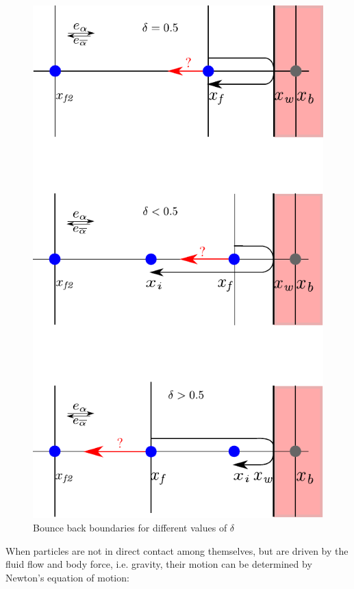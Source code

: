 \begin{figure}[htbp]
\centering
\includegraphics[scale=1]{bouncemod}
\caption{Bounce back boundaries for different values of $\delta$}
\label{fig:bouncemod}
\end{figure}

When particles are not in direct contact among themselves, but are driven by 
the fluid flow and body force, i.e. gravity, their motion can be determined by 
Newton's equation of motion:

